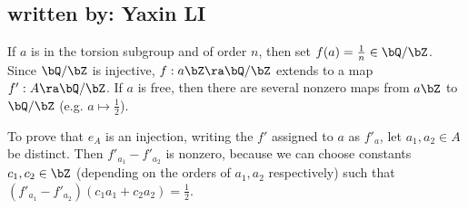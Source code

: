 \subsection{written by: Yaxin LI} \label{ex2.3.2}
If $a$ is in the torsion subgroup and of order $n$, then set $f(a)=\frac{1}{n}\in\bQ/\bZ$. Since $\bQ/\bZ$ is injective, $f:a\bZ\ra\bQ/\bZ$ extends to a map $f':A\ra\bQ/\bZ$. If $a$ is free, then there are several nonzero maps from $a\bZ$ to $\bQ/\bZ$ (e.g. $a\mapsto\frac{1}{2}$).

To prove that $e_A$ is an injection, writing the $f'$ assigned to $a$ as $f'_a$, let $a_1,a_2\in A$ be distinct. Then $f'_{a_1}-f'_{a_2}$ is nonzero, because we can choose constants $c_1,c_2\in\bZ$ (depending on the orders of $a_1,a_2$ respectively) such that $(f'_{a_1}-f'_{a_2})(c_1a_1+c_2a_2)=\frac{1}{2}$.